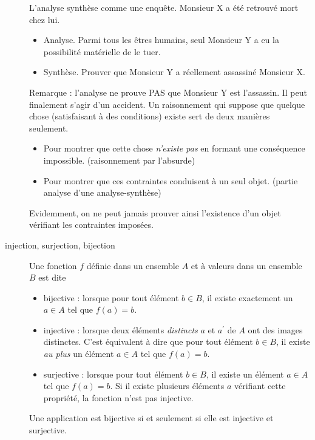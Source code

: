 \begin{description}
L'analyse synthèse comme une enquête.\newline
Monsieur X a été retrouvé mort chez lui.
\begin{itemize}
 \item Analyse. Parmi tous les êtres humains, seul Monsieur Y a eu la possibilité matérielle de le tuer.
 \item Synthèse. Prouver que Monsieur Y a réellement assassiné Monsieur X.
\end{itemize}
Remarque : l'analyse ne prouve PAS que Monsieur Y est l'assassin. Il peut finalement s'agir d'un accident.\newline
Un raisonnement qui suppose que quelque chose (satisfaisant à des conditions) existe sert de deux manières seulement.
\begin{itemize}
 \item Pour montrer que cette chose \emph{n'existe pas} en formant une conséquence impossible.  (raisonnement par l'absurde)
 \item Pour montrer que ces contraintes conduisent à un seul objet. (partie analyse d'une analyse-synthèse)  
\end{itemize}
Evidemment, on ne peut jamais prouver ainsi l'existence d'un objet vérifiant les contraintes imposées.


\item[injection, surjection, bijection] Une fonction $f$ définie dans un ensemble $A$ et à valeurs dans un ensemble $B$  est dite
\begin{itemize}
 \item bijective : lorsque pour tout élément $b\in B$, il existe exactement un $a\in A$ tel que $f(a)=b$.
\item injective : lorsque deux éléments \emph{distincts} $a$ et $a^\prime$ de $A$ ont des images distinctes. C'est équivalent à dire que pour tout élément $b\in B$, il existe \emph{au plus} un élément $a\in A$ tel que $f(a)=b$.
\item surjective : lorsque pour tout élément $b\in B$, il existe un élément $a\in A$ tel que $f(a)=b$. Si il existe plusieurs éléments $a$ vérifiant cette propriété, la fonction n'est pas injective.
\end{itemize}
Une application est bijective si et seulement si elle est injective et surjective.

\end{description}



